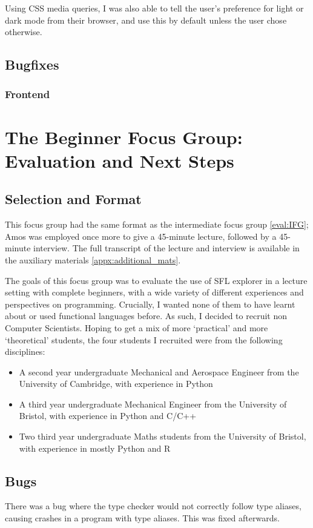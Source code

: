Using CSS media queries, I was also able to tell the user's preference for light or dark mode from their browser, and use this by default unless the user chose otherwise. 

\subsection{Bugfixes}
\subsubsection{Frontend}

\section{The Beginner Focus Group: Evaluation and Next Steps}
\label{eval:BFG}
\subsection{Selection and Format}
This focus group had the same format as the intermediate focus group \ref{eval:IFG}; Amos was employed once more to give a 45-minute lecture, followed by a 45-minute interview. The full transcript of the lecture and interview is available in the auxiliary materials \ref{appx:additional_mats}.

The goals of this focus group was to evaluate the use of SFL explorer in a lecture setting with complete beginners, with a wide variety of different experiences and perspectives on programming. Crucially, I wanted none of them to have learnt about or used functional languages before. As such, I decided to recruit non Computer Scientists. Hoping to get a mix of more `practical' and more `theoretical' students, the four students I recruited were from the following disciplines:

\begin{itemize}
    \item A second year undergraduate Mechanical and Aerospace Engineer from the University of Cambridge, with experience in Python
    \item A third year undergraduate Mechanical Engineer from the University of Bristol, with experience in Python and C/C++
    \item Two third year undergraduate Maths students from the University of Bristol, with experience in mostly Python and R
\end{itemize}

\subsection{Bugs}
There was a bug where the type checker would not correctly follow type aliases, causing crashes in a program with type aliases. This was fixed afterwards. 

